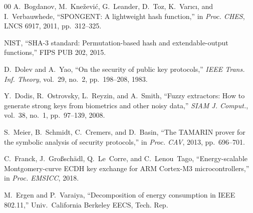 \documentclass[conference]{IEEEtran}
\begin{document}
\begin{thebibliography}{00}
A.~Bogdanov, M.~Kne\v{z}evi\'c, G.~Leander, D.~Toz, K.~Var{\i}c{\i}, and I.~Verbauwhede, ``SPONGENT: A lightweight hash function,'' in \emph{Proc. CHES}, LNCS 6917, 2011, pp.~312--325.

NIST, ``SHA-3 standard: Permutation-based hash and extendable-output functions,'' FIPS PUB 202, 2015.

D.~Dolev and A.~Yao, ``On the security of public key protocols,'' \emph{IEEE Trans. Inf. Theory}, vol.~29, no.~2, pp.~198--208, 1983.

Y.~Dodis, R.~Ostrovsky, L.~Reyzin, and A.~Smith, ``Fuzzy extractors: How to generate strong keys from biometrics and other noisy data,'' \emph{SIAM J. Comput.}, vol.~38, no.~1, pp.~97--139, 2008.

S.~Meier, B.~Schmidt, C.~Cremers, and D.~Basin, ``The TAMARIN prover for the symbolic analysis of security protocols,'' in \emph{Proc. CAV}, 2013, pp.~696--701.

C.~Franck, J.~Gro{\ss}sch\"adl, Q.~Le~Corre, and C.~Lenou~Tago, ``Energy-scalable Montgomery-curve ECDH key exchange for ARM Cortex-M3 microcontrollers,'' in \emph{Proc. EMSICC}, 2018.

M.~Ergen and P.~Varaiya, ``Decomposition of energy consumption in IEEE 802.11,'' Univ.\ California Berkeley EECS, Tech. Rep.

\end{thebibliography}
\end{document}
